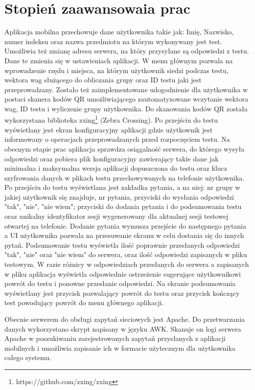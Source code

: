 \documentclass{report}
\begin{document}
	\chapter{Stopień zaawansowaia prac}
	
	Aplikacja mobilna przechowuje dane użytkownika takie jak: Imię, Nazwisko, numer indeksu oraz nazwa przedmiotu na którym wykonywany jest test. Umożliwia też zmianę adresu serwera, na który przysyłane są odpowiedzi z testu. Dane te zmienia się w ustawieniach aplikacji. W menu głównym pozwala na wprowadzenie rzędu i miejsca, na którym użytkownik siedzi podczas testu, wektora wag służącego do obliczania grupy oraz ID testu jaki jest przeprowadzany. Zostało też zaimplementowane udogodnienie dla użytkownika w postaci skanera kodów QR umożliwiającego zautomatyzowane wczytanie wektora wag, ID testu i wyliczenie grupy użytkownika. Do skanowania kodów QR została wykorzystana biblioteka zxing\footnote{https://github.com/zxing/zxing} (Zebra Crossing). Po przejściu do testu wyświetlany jest ekran konfiguracyjny aplikacji gdzie użytkownik jest informowany o operacjach przeprowadzanych przed rozpoczęciem testu. Na obecnym etapie prac aplikacja sprawdza osiągalność serwera, do którego wysyła odpowiedzi oraz pobiera plik konfiguracyjny zawierający takie dane jak minimalna i maksymalna wersja aplikacji dopuszczona do testu oraz klucz szyfrowania danych w plikach testu przechowywanych na telefonie użytkownika. Po przejściu do testu wyświetlana jest zakładka pytania, a na niej: nr grupy w jakiej użytkownik się znajduje, nr pytania, przyciski do wysłania odpowiedzi "tak", "nie", "nie wiem"; przyciski do dodania pytania i do podsumowania testu oraz unikalny identyfikator sesji wygenerowany dla aktualnej sesji testowej otwartej na telefonie. Dodanie pytania wymusza przejście do następnego pytania a UI użytkownika pozwala na przesuwanie ekranu w celu dostania się do innych pytań. Podsumowanie testu wyświetla ilość poprawnie przesłanych odpowiedzi "tak", "nie" oraz "nie wiem" do serwera, oraz ilość odpowiedzi zapisanych w pliku testowym. W razie różnicy w odpowiedziach przesłanych do serwera a zapisanych w pliku aplikacja wyświetla odpowiednie ostrzeżenie sugerujące użytkownikowi powrót do testu i ponowne przesłanie odpowiedzi. Na ekranie podsumowania wyświetlany jest przycisk pozwalający powrót do testu oraz przycisk kończący test powodujący powrót do menu głównego aplikacji.
	
	Obecnie serwerem do obsługi zapytań sieciowych jest Apache. Do przetwarzania danych wykorzystano skrypt napisany w języku AWK. Skanuje on logi serwera Apache w poszukiwaniu zarejestrowanych zapytań przysłanych z aplikacji mobilnych i umożliwia zapisanie ich w formacie użytecznym dla użytkownika całego systemu.
	
\end{document}
